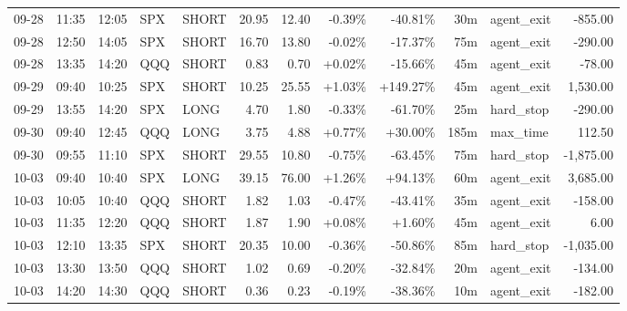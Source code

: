 \documentclass[11pt,a4paper,twoside]{article}
\begin{document}
\begin{center}
\begin{longtable}{>{\color{txtmain}}l l l l l r r r r r >{\color{txtmain}}l r}
09-28 & 11:35 & 12:05 & SPX & SHORT & 20.95 & 12.40 & \textcolor{lossred}{-0.39\%} & \textcolor{lossred}{-40.81\%} & 30m & agent\_exit & \textcolor{lossred}{-855.00} \\
09-28 & 12:50 & 14:05 & SPX & SHORT & 16.70 & 13.80 & \textcolor{lossred}{-0.02\%} & \textcolor{lossred}{-17.37\%} & 75m & agent\_exit & \textcolor{lossred}{-290.00} \\
09-28 & 13:35 & 14:20 & QQQ & SHORT & 0.83 & 0.70 & \textcolor{wingreen}{+0.02\%} & \textcolor{lossred}{-15.66\%} & 45m & agent\_exit & \textcolor{lossred}{-78.00} \\
09-29 & 09:40 & 10:25 & SPX & SHORT & 10.25 & 25.55 & \textcolor{wingreen}{+1.03\%} & \textcolor{wingreen}{+149.27\%} & 45m & agent\_exit & \textcolor{wingreen}{1,530.00} \\
09-29 & 13:55 & 14:20 & SPX & LONG & 4.70 & 1.80 & \textcolor{lossred}{-0.33\%} & \textcolor{lossred}{-61.70\%} & 25m & hard\_stop & \textcolor{lossred}{-290.00} \\
09-30 & 09:40 & 12:45 & QQQ & LONG & 3.75 & 4.88 & \textcolor{wingreen}{+0.77\%} & \textcolor{wingreen}{+30.00\%} & 185m & max\_time & \textcolor{wingreen}{112.50} \\
09-30 & 09:55 & 11:10 & SPX & SHORT & 29.55 & 10.80 & \textcolor{lossred}{-0.75\%} & \textcolor{lossred}{-63.45\%} & 75m & hard\_stop & \textcolor{lossred}{-1,875.00} \\
10-03 & 09:40 & 10:40 & SPX & LONG & 39.15 & 76.00 & \textcolor{wingreen}{+1.26\%} & \textcolor{wingreen}{+94.13\%} & 60m & agent\_exit & \textcolor{wingreen}{3,685.00} \\
10-03 & 10:05 & 10:40 & QQQ & SHORT & 1.82 & 1.03 & \textcolor{lossred}{-0.47\%} & \textcolor{lossred}{-43.41\%} & 35m & agent\_exit & \textcolor{lossred}{-158.00} \\
10-03 & 11:35 & 12:20 & QQQ & SHORT & 1.87 & 1.90 & \textcolor{wingreen}{+0.08\%} & \textcolor{wingreen}{+1.60\%} & 45m & agent\_exit & \textcolor{wingreen}{6.00} \\
10-03 & 12:10 & 13:35 & SPX & SHORT & 20.35 & 10.00 & \textcolor{lossred}{-0.36\%} & \textcolor{lossred}{-50.86\%} & 85m & hard\_stop & \textcolor{lossred}{-1,035.00} \\
10-03 & 13:30 & 13:50 & QQQ & SHORT & 1.02 & 0.69 & \textcolor{lossred}{-0.20\%} & \textcolor{lossred}{-32.84\%} & 20m & agent\_exit & \textcolor{lossred}{-134.00} \\
10-03 & 14:20 & 14:30 & QQQ & SHORT & 0.36 & 0.23 & \textcolor{lossred}{-0.19\%} & \textcolor{lossred}{-38.36\%} & 10m & agent\_exit & \textcolor{lossred}{-182.00} \\

\end{longtable}
\end{center}
\end{document}
